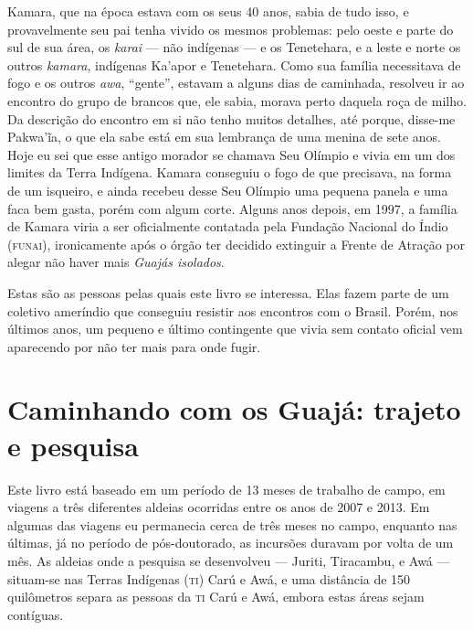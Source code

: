 Kamara, que na época estava com os seus 40 anos, sabia de tudo isso, e
provavelmente seu pai tenha vivido os mesmos problemas: pelo oeste e
parte do sul de sua área, os \textit{karai} --- não indígenas --- e os Tenetehara, e a leste e norte os outros \textit{kamara}, indígenas
Ka'apor e Tenetehara. Como sua família necessitava de fogo e os outros
\textit{awa}, ``gente'', estavam a alguns dias de caminhada, resolveu ir ao
encontro do grupo de brancos que, ele sabia, morava perto daquela
roça de milho. Da descrição do encontro em si não tenho muitos detalhes,
até porque, disse-me Pakwa'ĩa, o que ela sabe está em sua lembrança de
uma menina de sete anos. Hoje eu sei que esse antigo morador se chamava
Seu Olímpio e vivia em um dos limites da Terra Indígena. Kamara
conseguiu o fogo de que precisava, na forma de um isqueiro, e ainda
recebeu desse Seu Olímpio uma pequena panela e uma faca bem gasta, porém
com algum corte. Alguns anos depois, em 1997, a família de Kamara viria
a ser oficialmente contatada pela Fundação Nacional do Índio (\textsc{funai}),
ironicamente após o órgão ter decidido extinguir a Frente de Atração por
alegar não haver mais \textit{Guajás isolados}.

Estas são as pessoas pelas quais este livro se interessa. Elas fazem
parte de um coletivo ameríndio que conseguiu resistir aos encontros com
o Brasil. Porém, nos últimos anos, um pequeno e último
contingente que vivia sem contato oficial vem aparecendo por não ter
mais para onde fugir.

\section{Caminhando com os Guajá: trajeto e pesquisa}

Este livro está baseado em um período de 13 meses de trabalho de campo,
em viagens a três diferentes aldeias ocorridas entre os anos de 2007 e
2013. Em algumas das viagens eu permanecia cerca de três meses no campo,
enquanto nas últimas, já no período de pós-doutorado, as incursões
duravam por volta de um mês. As aldeias onde a pesquisa se desenvolveu --- Juriti, Tiracambu, e Awá --- situam-se nas Terras Indígenas (\textsc{ti}) Carú e Awá, e uma
distância de 150 quilômetros separa as pessoas da \textsc{ti} Carú e Awá, embora estas áreas
sejam contíguas. 

